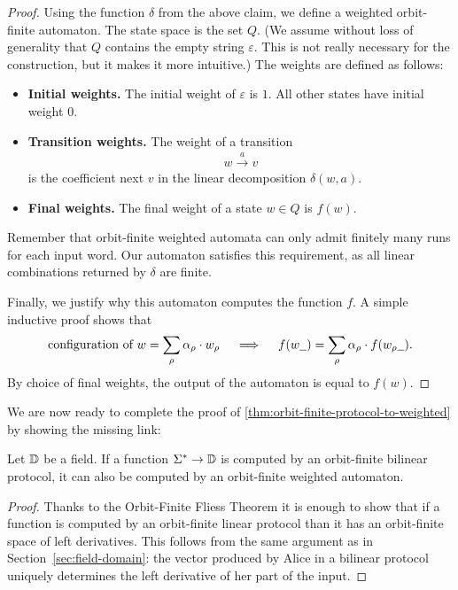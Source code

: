 \begin{proof}
    Using the function $\delta$ from the above claim, we define a weighted orbit-finite automaton. The state space is the set $Q$. (We assume without loss of generality that $Q$ contains the empty string $\varepsilon$. This is not really necessary for the construction, but it makes it more intuitive.) The weights are defined as follows: 
    \begin{itemize}
        \item \textbf{Initial weights.} The initial weight of   $\varepsilon$ is $1$. All other states have initial weight $0$.
        \item \textbf{Transition weights.} The weight of a transition 
        \begin{align*}
        w \xrightarrow{a} v
        \end{align*}
    is the coefficient next $v$ in the linear decomposition $\delta(w,a)$.
        \item \textbf{Final weights.} The final weight of a state $w \in Q$ is $f(w)$.
    \end{itemize}
    Remember that orbit-finite weighted automata can only admit finitely many runs for each input word.
    Our automaton satisfies this requirement, as all linear combinations returned by $\delta$ are finite. 

    Finally, we justify why this automaton computes the function $f$.   A simple inductive proof shows that  
    \begin{align*}
\text{configuration of $w$} = \sum_\rho \alpha_\rho \cdot w_\rho
\quad \implies \quad 
        f(w\underline{\hspace{2mm}}) = 
    \sum_\rho \alpha_\rho \cdot f(w_\rho\underline{\hspace{2mm}}).
    \end{align*}
    By choice of final weights,  the output of the automaton is equal to $f(w)$. 
\end{proof}

We are now ready to complete the proof of \cref{thm:orbit-finite-protocol-to-weighted} by showing the missing link:
\begin{claim}
\label{claim:bilinear-prot-to-of-automaton}
Let $\mathbb D$ be a field.
    If a function $\Sigma^* \to \mathbb D$ is computed by an orbit-finite bilinear protocol, it can also be computed by an 
    orbit-finite weighted automaton. 
\end{claim}
\begin{proof}
    Thanks to the Orbit-Finite Fliess Theorem it is enough to show that if a function is computed by an orbit-finite linear 
    protocol than it has an orbit-finite space of left derivatives. This follows from the same argument as in Section~\ref{sec:field-domain}:
    the vector produced by Alice in a bilinear protocol uniquely determines the left derivative of her part of the input. 
\end{proof}
